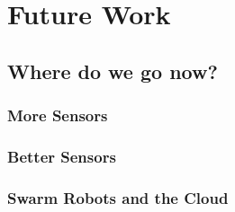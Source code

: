 
\chapter{Future Work} %

\label{Chapter8} %



\section{Where do we go now?}
\subsection{More Sensors}
\subsection{Better Sensors}
\subsection{Swarm Robots and the Cloud}

